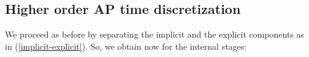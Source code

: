 \documentclass[final,11pt]{siamart251216}
\numberwithin{equation}{section}
\theoremstyle{definition}
\theoremstyle{remark}
\begin{document}
\subsection{Higher order AP time discretization}
We proceed as before by separating the implicit and the explicit components as in (\ref{implicit-explicit}).
So, we obtain now  for the internal stages: 
\end{document}
